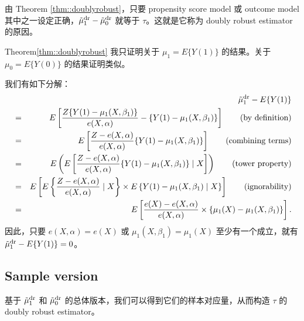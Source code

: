 由 Theorem \ref{thm::doublyrobust}，只要 propensity score model 或 outcome model 其中之一设定正确，$\tilde{\mu}_1^\textup{dr} - \tilde{\mu}_0^\textup{dr} $ 就等于 $\tau$。这就是它称为 doubly robust estimator 的原因。


\begin{myproof}{Theorem}{\ref{thm::doublyrobust}}
我只证明关于 $\mu_1 = E\{  Y(1) \}$ 的结果。关于 $\mu_0 = E\{  Y(0) \}$ 的结果证明类似。


我们有如下分解：
\begin{eqnarray*}
&&\tilde{\mu}_1^\textup{dr} - E\{  Y(1) \}     \\
&=& E\left[   \frac{Z\{ Y(1)-\mu_1(X,\beta_1) \}}{  e(X,\alpha) }   - \{ Y(1) -  \mu_1(X, \beta_1) \} \right]  
\qquad (\text{by definition})\\
&=&    E\left[   \frac{Z - e(X,\alpha) }{  e(X,\alpha) }   \{ Y(1) -  \mu_1(X, \beta_1) \} \right]  
\qquad (\text{combining terms})\\
&=&  E\left(  E\left[   \frac{Z - e(X,\alpha) }{  e(X,\alpha) }   \{ Y(1) -  \mu_1(X, \beta_1) \} \mid X \right] \right) 
\qquad (\text{tower property})\\
&=& E\left[  E\left\{   \frac{Z - e(X,\alpha) }{  e(X,\alpha) } \mid X \right\} \times E\left\{  Y(1) -  \mu_1(X, \beta_1)  \mid X \right\} \right] 
\qquad (\text{ignorability})\\
&=& E\left[   \frac{e(X) - e(X,\alpha) }{  e(X,\alpha) }  \times  \left\{  \mu_1(X) -  \mu_1(X, \beta_1)   \right\} \right]  . 
\end{eqnarray*}
因此，只要 $e(X,\alpha) = e(X)$ 或 $\mu_1(X, \beta_1) = \mu_1(X)$ 至少有一个成立，就有 $\tilde{\mu}_1^\textup{dr} - E\{  Y(1) \}  = 0$。
\end{myproof}



 

\subsection{Sample version}


基于 $\tilde{\mu}_1^\textup{dr} $ 和 $\tilde{\mu}_0^\textup{dr} $ 的总体版本，我们可以得到它们的样本对应量，从而构造 $\tau$ 的 doubly robust estimator。


